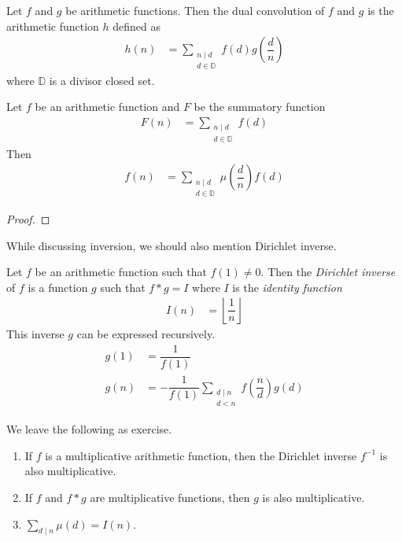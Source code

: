 \documentclass[elemannt.tex]{subfile}
\begin{document}
		\begin{definition}
			Let $f$ and $g$ be arithmetic functions. Then the dual convolution of $f$ and $g$ is the arithmetic function $h$ defined as
				\begin{align*}
					h(n)
						& = \sum_{\substack{n\mid d\\d\in\mathbb{D}}}f(d)g\left(\dfrac{d}{n}\right)
				\end{align*}
			where $\mathbb{D}$ is a divisor closed set.
		\end{definition}
	
		\begin{theorem}
			Let $f$ be an arithmetic function and $F$ be the summatory function
				\begin{align*}
					F(n)
						& = \sum_{\substack{n\mid d\\d\in\mathbb{D}}}f(d)
				\end{align*}
			Then
				\begin{align*}
					f(n)
						& = \sum_{\substack{n\mid d\\d\in\mathbb{D}}}\mu\left(\dfrac{d}{n}\right)f(d)
				\end{align*}
		\end{theorem}
	
		\begin{proof}
			
		\end{proof}
	While discussing inversion, we should also mention Dirichlet inverse.
		\begin{definition}
			Let $f$ be an arithmetic function such that $f(1)\neq 0$. Then the \textit{Dirichlet inverse} of $f$ is a function $g$ such that $f\ast g=I$ where $I$ is the \textit{identity function}
				\begin{align*}
					I(n)
						& = \left\lfloor{\dfrac{1}{n}}\right\rfloor
				\end{align*}
			This inverse $g$ can be expressed recursively.
				\begin{align*}
					g(1)
						& = \dfrac{1}{f(1)}\\
					g(n)
						& = -\dfrac{1}{f(1)}\sum_{\substack{d\mid n\\d<n}}f\left(\dfrac{n}{d}\right)g(d)
				\end{align*}
		\end{definition}
	We leave the following as exercise.
		\begin{enumerate}
			\item If $f$ is a multiplicative arithmetic function, then the Dirichlet inverse $f^{-1}$ is also multiplicative.
			\item If $f$ and $f\ast g$ are multiplicative functions, then $g$ is also multiplicative.
			\item $\sum_{d\mid n}\mu(d)=I(n)$.
		\end{enumerate}
\end{document}

